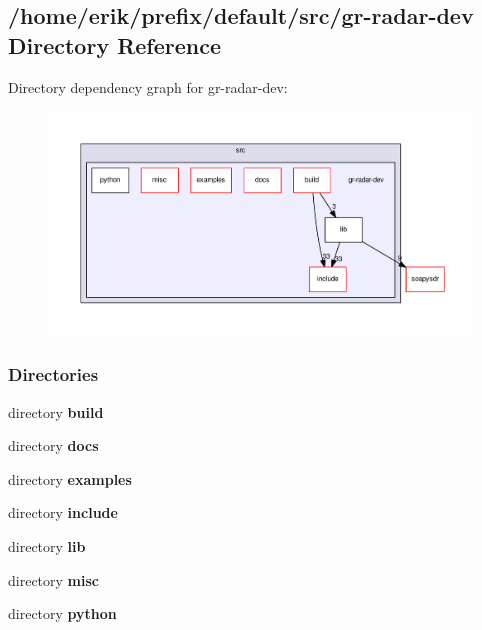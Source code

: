 \subsection{/home/erik/prefix/default/src/gr-\/radar-\/dev Directory Reference}
\label{dir_887ed9244c43472132af234b8e73d657}
Directory dependency graph for gr-\/radar-\/dev\+:
\nopagebreak
\begin{figure}[H]
\begin{center}
\leavevmode
\includegraphics[width=350pt]{dir_887ed9244c43472132af234b8e73d657_dep}
\end{center}
\end{figure}
\subsubsection*{Directories}
\begin{DoxyCompactItemize}
\item 
directory {\bf build}
\item 
directory {\bf docs}
\item 
directory {\bf examples}
\item 
directory {\bf include}
\item 
directory {\bf lib}
\item 
directory {\bf misc}
\item 
directory {\bf python}
\end{DoxyCompactItemize}
